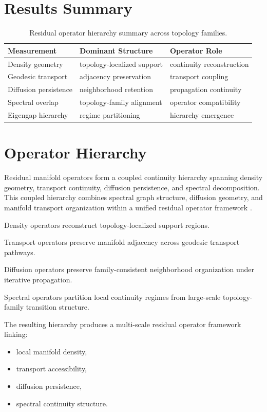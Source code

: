 \documentclass[11pt]{article}
\begin{document}
\section{Results Summary}

\begin{table}[H]
\centering
\caption{Residual operator hierarchy summary across topology families.}
\begin{tabular}{lll}
\toprule
Measurement & Dominant Structure & Operator Role \\
\midrule
Density geometry & topology-localized support & continuity reconstruction \\
Geodesic transport & adjacency preservation & transport coupling \\
Diffusion persistence & neighborhood retention & propagation continuity \\
Spectral overlap & topology-family alignment & operator compatibility \\
Eigengap hierarchy & regime partitioning & hierarchy emergence \\
\bottomrule
\end{tabular}
\end{table}

\section{Operator Hierarchy}

Residual manifold operators form a coupled continuity hierarchy spanning density geometry, transport continuity, diffusion persistence, and spectral decomposition. This coupled hierarchy combines spectral graph structure, diffusion geometry, and manifold transport organization within a unified residual operator framework \cite{chung1997spectral,coifman2006diffusion,villani2008optimal}.

Density operators reconstruct topology-localized support regions.

Transport operators preserve manifold adjacency across geodesic transport pathways.

Diffusion operators preserve family-consistent neighborhood organization under iterative propagation.

Spectral operators partition local continuity regimes from large-scale topology-family transition structure.

The resulting hierarchy produces a multi-scale residual operator framework linking:

\begin{itemize}
\item local manifold density,
\item transport accessibility,
\item diffusion persistence,
\item spectral continuity structure.
\end{itemize}
\end{document}
